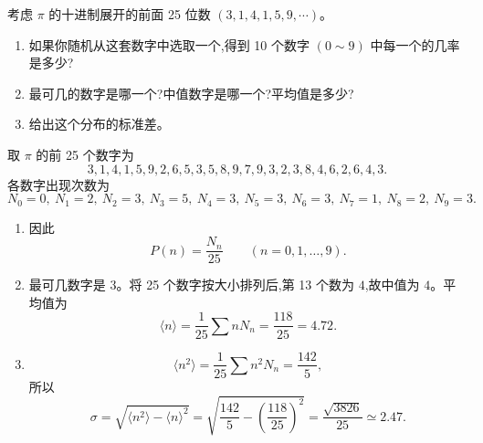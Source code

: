 \begin{question}
考虑 $\pi$ 的十进制展开的前面 25 位数 $(3,1,4,1,5,9,\cdots)$。
\begin{enumerate}
\item 如果你随机从这套数字中选取一个,得到 10 个数字 $(0\sim 9)$ 中每一个的几率是多少?
\item 最可几的数字是哪一个?中值数字是哪一个?平均值是多少?
\item 给出这个分布的标准差。
\end{enumerate}
\begin{solution}
取 $\pi$ 的前 25 个数字为
\[
3,1,4,1,5,9,2,6,5,3,5,8,9,7,9,3,2,3,8,4,6,2,6,4,3.
\]
各数字出现次数为
\[
N_0=0,\ N_1=2,\ N_2=3,\ N_3=5,\ N_4=3,\ N_5=3,\ N_6=3,\ N_7=1,\ N_8=2,\ N_9=3.
\]
\begin{enumerate}
\item 因此
\[
P(n)=\frac{N_n}{25}\qquad(n=0,1,\ldots,9).
\]
\item 最可几数字是 $3$。将 25 个数字按大小排列后,第 13 个数为 $4$,故中值为 $4$。平均值为
\[
\langle n\rangle=\frac{1}{25}\sum nN_n=\frac{118}{25}=4.72.
\]
\item
\[
\langle n^2\rangle=\frac{1}{25}\sum n^2N_n=\frac{142}{5},
\]
所以
\[
\sigma=\sqrt{\langle n^2\rangle-\langle n\rangle^2}
=\sqrt{\frac{142}{5}-\left(\frac{118}{25}\right)^2}
=\frac{\sqrt{3826}}{25}\simeq 2.47.
\]
\end{enumerate}
\end{solution}
\end{question}

